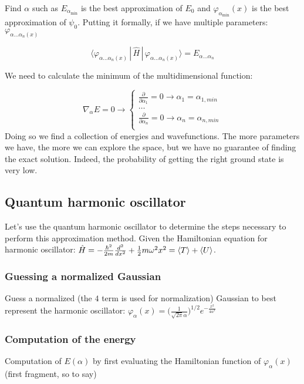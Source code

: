 	Find $\alpha$ such as $E_{\alpha_{\min}}$ is the best approximation of $E_0$ and $\varphi_{\alpha_{\min}}(x)$ is the best approximation of $\psi_0$.
	Putting it formally, if we have multiple parameters: $\varphi_{\alpha \dots \alpha_n(x)}$

	$$\langle\varphi_{\alpha \dots \alpha_n(x)}\,|\,\hat{H}\,|\,\varphi_{\alpha \dots \alpha_n(x)}\rangle = E_{\alpha \dots \alpha_n}$$

	We need to calculate the minimum of the multidimensional function:

	$$\nabla_{\alpha}E=0 \rightarrow\begin{cases}\frac{\partial}{\partial \alpha_1}=0 \rightarrow \alpha_1=\alpha_{1, min}\\\dots\\\frac{\partial}{\partial \alpha_n}=0 \rightarrow \alpha_n= \alpha_{n, min}\\\end{cases}$$
	Doing so we find a collection of energies and wavefunctions.
	The more parameters we have, the more we can explore the space, but  we have no guarantee of finding the exact solution.
	Indeed, the probability of getting the right ground state is very low.

	\subsection{Quantum harmonic oscillator}
	Let's use the quantum harmonic oscillator to determine the steps necessary to perform this approximation method.
	Given the Hamiltonian equation for harmonic oscillator: $\hat{H}=-\frac{\hbar^2}{2m}\frac{d^2}{dx^2}+\frac{1}{2}m\omega^2x^2=\expval{T}+\expval{U}$.

		\subsubsection{Guessing a normalized Gaussian}
		Guess a normalized (the $4$ term is used for normalization) Gaussian to best represent the harmonic oscillator: $\varphi_{\alpha}(x)=\bigg(\frac{1}{\sqrt{2\pi}\alpha}\bigg)^{1/2}e^{-{\frac{x^2}{4\alpha^2}}}$

		\subsubsection{Computation of the energy}
		Computation of $E(\alpha)$ by first evaluating the Hamiltonian function of $\varphi_{\alpha}(x)$ (first fragment, so to say)

